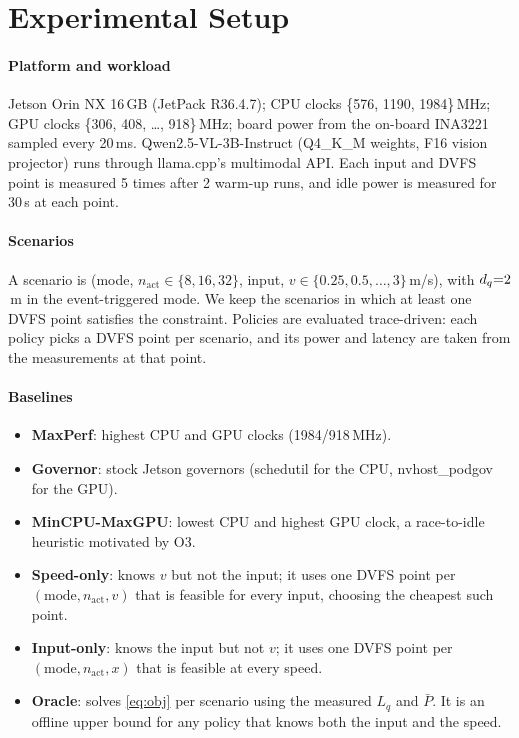 \documentclass[conference]{IEEEtran}
\newcommand{\Lq}{L_{q}}
\newcommand{\nact}{n_{\mathrm{act}}}
\begin{document}
\section{Experimental Setup}
\label{sec:exp}

\paragraph{Platform and workload}
Jetson Orin NX 16\,GB (JetPack R36.4.7); CPU clocks \{576, 1190, 1984\}\,MHz; GPU clocks
\{306, 408, \dots, 918\}\,MHz; board power from the on-board INA3221 sampled every 20\,ms.
Qwen2.5-VL-3B-Instruct (Q4\_K\_M weights, F16 vision projector) runs through llama.cpp's multimodal API.
Each input and DVFS point is measured 5 times after 2 warm-up runs, and idle power is measured for 30\,s at each point.

\paragraph{Scenarios}
A scenario is (mode, $\nact\in\{8,16,32\}$, input, $v \in \{0.25, 0.5, \dots, 3\}$\,m/s), with $d_q{=}2$\,m in
the event-triggered mode. We keep the \NScen{} scenarios in which at least one DVFS point satisfies the
constraint. Policies are evaluated trace-driven: each policy picks a DVFS point per scenario, and its
power and latency are taken from the measurements at that point.

\paragraph{Baselines}
\begin{itemize}
  \item \textbf{MaxPerf}: highest CPU and GPU clocks (1984/918\,MHz).
  \item \textbf{Governor}: stock Jetson governors (schedutil for the CPU, nvhost\_podgov for the GPU).
  \item \textbf{MinCPU-MaxGPU}: lowest CPU and highest GPU clock, a race-to-idle heuristic motivated by O3.
  \item \textbf{Speed-only}: knows $v$ but not the input; it uses one DVFS point per $(\text{mode}, \nact, v)$
        that is feasible for every input, choosing the cheapest such point.
  \item \textbf{Input-only}: knows the input but not $v$; it uses one DVFS point per $(\text{mode}, \nact, x)$
        that is feasible at every speed.
  \item \textbf{Oracle}: solves \cref{eq:obj} per scenario using the measured $\Lq$ and $\bar P$. It is an offline upper
        bound for any policy that knows both the input and the speed.
\end{itemize}
\end{document}
